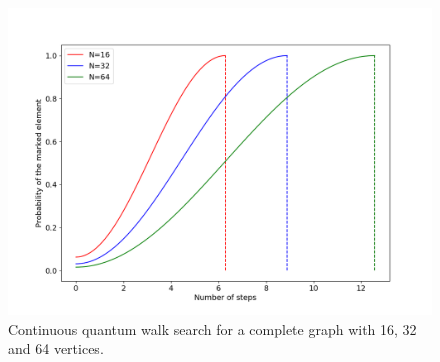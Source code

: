             	\begin{figure}[!t]
                    \centering \includegraphics[scale=0.40]{img/ContQW/search/163264.png}
                     \caption{Continuous quantum walk search for a complete graph with 16, 32 and 64 vertices.}\label{fig:ContSearch}
                \end{figure}
                

